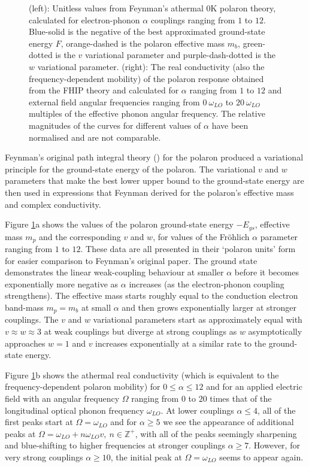 \begin{figure}
{\begin{subfigure}[b]{.6\textwidth}
\end{subfigure}%
}
\caption{(left): Unitless values from Feynman's athermal $0$K polaron theory, calculated for electron-phonon $\alpha$ couplings ranging from $1$ to $12$. Blue-solid is the negative of the best approximated ground-state energy $F$, orange-dashed is the polaron effective mass $m_b$, green-dotted is the $v$ variational parameter and purple-dash-dotted is the $w$ variational parameter. (right): The real conductivity (also the frequency-dependent mobility) of the polaron response obtained from the FHIP theory and calculated for $\alpha$ ranging from $1$ to $12$ and external field angular frequencies ranging from $0\ \omega_{LO}$ to $20\ \omega_{LO}$ multiples of the effective phonon angular frequency. The relative magnitudes of the curves for different values of $\alpha$ have been normalised and are not comparable.}
\label{fig:athermaltheory}
\end{figure}

Feynman's original path integral theory (\cite{feynman_slow_1955}) for the polaron produced a variational principle for the ground-state energy of the polaron. The variational $v$ and $w$ parameters that make the best lower upper bound to the ground-state energy are then used in expressions that Feynman derived for the polaron's effective mass and complex conductivity. 

Figure \ref{fig:athermaltheory}a shows the values of the polaron ground-state energy $-E_{gs}$, effective mass $m_p$ and the corresponding $v$ and $w$, for values of the Fr\"ohlich $\alpha$ parameter ranging from $1$ to $12$. These data are all presented in their `polaron units' form for easier comparison to Feynman's original paper. The ground state demonstrates the linear weak-coupling behaviour at smaller $\alpha$ before it becomes exponentially more negative as $\alpha$ increases (as the electron-phonon coupling strengthens). The effective mass starts roughly equal to the conduction electron band-mass $m_p = m_b $ at small $\alpha$ and then grows exponentially larger at stronger couplings. The $v$ and $w$ variational parameters start as approximately equal with $v \approx w \approx 3$ at weak couplings but diverge at strong couplings as $w$ asymptotically approaches $w = 1$ and $v$ increases exponentially at a similar rate to the ground-state energy. 

Figure \ref{fig:athermaltheory}b shows the athermal real conductivity (which is equivalent to the frequency-dependent polaron mobility) for $0 \leq \alpha \leq 12$ and for an applied electric field with an angular frequency $\Omega$ ranging from $0$ to $20$ times that of the longitudinal optical phonon frequency $\omega_{LO}$. At lower couplings $\alpha \leq 4$, all of the first peaks start at $\Omega = \omega_{LO}$ and for $\alpha \geq 5$ we see the appearance of additional peaks at $\Omega = \omega_{LO} + n \omega_{LO} v,\ n \in \mathbb{Z}^+$, with all of the peaks seemingly sharpening and blue-shifting to higher frequencies at stronger couplings $\alpha \geq 7$. However, for very strong couplings $\alpha \geq 10$, the initial peak at $\Omega = \omega_{LO}$ seems to appear again.

